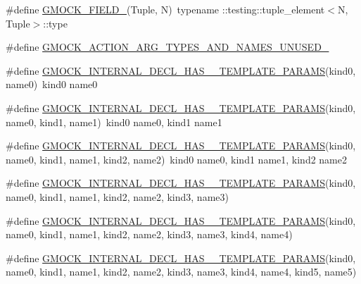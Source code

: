 \begin{DoxyCompactItemize}
\item 
\#define \mbox{\hyperlink{gmock-generated-actions_8h_a6eb3ce92b0613603057a20ec9e593317}{G\+M\+O\+C\+K\+\_\+\+F\+I\+E\+L\+D\+\_\+}}(Tuple,  N)~typename \+::testing\+::tuple\+\_\+element$<$N, Tuple$>$\+::type
\item 
\#define \mbox{\hyperlink{gmock-generated-actions_8h_a069f37fdbe36aabe65da6eb6221b9b19}{G\+M\+O\+C\+K\+\_\+\+A\+C\+T\+I\+O\+N\+\_\+\+A\+R\+G\+\_\+\+T\+Y\+P\+E\+S\+\_\+\+A\+N\+D\+\_\+\+N\+A\+M\+E\+S\+\_\+\+U\+N\+U\+S\+E\+D\+\_\+}}
\item 
\#define \mbox{\hyperlink{gmock-generated-actions_8h_a8b8b1a43495f82aefe40c410bc1ce392}{G\+M\+O\+C\+K\+\_\+\+I\+N\+T\+E\+R\+N\+A\+L\+\_\+\+D\+E\+C\+L\+\_\+\+H\+A\+S\+\_\+\_\+\+T\+E\+M\+P\+L\+A\+T\+E\+\_\+\+P\+A\+R\+A\+MS}}(kind0,  name0)~kind0 name0
\item 
\#define \mbox{\hyperlink{gmock-generated-actions_8h_aa238172d277a7ba189a5d481356a6c66}{G\+M\+O\+C\+K\+\_\+\+I\+N\+T\+E\+R\+N\+A\+L\+\_\+\+D\+E\+C\+L\+\_\+\+H\+A\+S\+\_\+\_\+\+T\+E\+M\+P\+L\+A\+T\+E\+\_\+\+P\+A\+R\+A\+MS}}(kind0,  name0,  kind1,  name1)~kind0 name0, kind1 name1
\item 
\#define \mbox{\hyperlink{gmock-generated-actions_8h_ae776d1f23c7b8defac49269c69e64baa}{G\+M\+O\+C\+K\+\_\+\+I\+N\+T\+E\+R\+N\+A\+L\+\_\+\+D\+E\+C\+L\+\_\+\+H\+A\+S\+\_\+\_\+\+T\+E\+M\+P\+L\+A\+T\+E\+\_\+\+P\+A\+R\+A\+MS}}(kind0,  name0,  kind1,  name1,  kind2,  name2)~kind0 name0, kind1 name1, kind2 name2
\item 
\#define \mbox{\hyperlink{gmock-generated-actions_8h_a19b48575600b1a046c3f77d5dfc124ba}{G\+M\+O\+C\+K\+\_\+\+I\+N\+T\+E\+R\+N\+A\+L\+\_\+\+D\+E\+C\+L\+\_\+\+H\+A\+S\+\_\+\_\+\+T\+E\+M\+P\+L\+A\+T\+E\+\_\+\+P\+A\+R\+A\+MS}}(kind0,  name0,  kind1,  name1,  kind2,  name2,  kind3,  name3)
\item 
\#define \mbox{\hyperlink{gmock-generated-actions_8h_aef0f11711d63f65561ce5a4d032673f8}{G\+M\+O\+C\+K\+\_\+\+I\+N\+T\+E\+R\+N\+A\+L\+\_\+\+D\+E\+C\+L\+\_\+\+H\+A\+S\+\_\+\_\+\+T\+E\+M\+P\+L\+A\+T\+E\+\_\+\+P\+A\+R\+A\+MS}}(kind0,  name0,  kind1,  name1,  kind2,  name2,  kind3,  name3,  kind4,  name4)
\item 
\#define \mbox{\hyperlink{gmock-generated-actions_8h_a4c90362350df0faa6e866642f44708fe}{G\+M\+O\+C\+K\+\_\+\+I\+N\+T\+E\+R\+N\+A\+L\+\_\+\+D\+E\+C\+L\+\_\+\+H\+A\+S\+\_\+\_\+\+T\+E\+M\+P\+L\+A\+T\+E\+\_\+\+P\+A\+R\+A\+MS}}(kind0,  name0,  kind1,  name1,  kind2,  name2,  kind3,  name3,  kind4,  name4,  kind5,  name5)

\end{DoxyCompactItemize}
